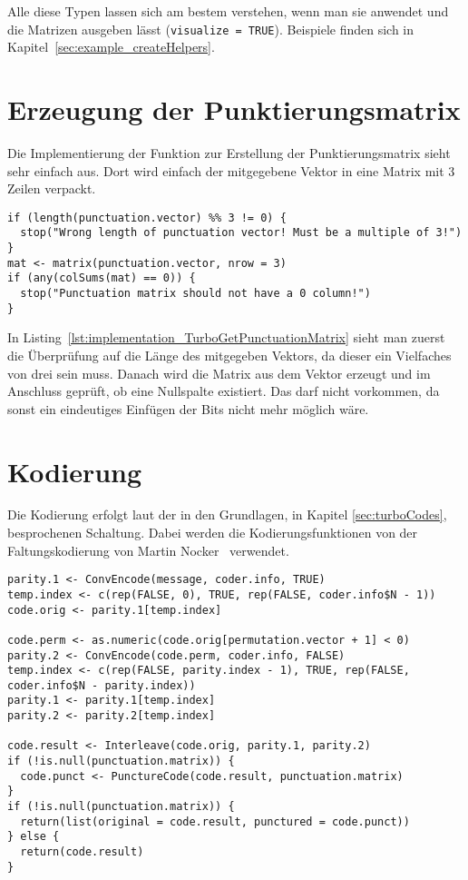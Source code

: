 Alle diese Typen lassen sich am bestem verstehen, wenn man sie anwendet und die Matrizen ausgeben lässt (\texttt{visualize = TRUE}). Beispiele finden sich in Kapitel~\ref{sec:example_createHelpers}.

\FloatBarrier
\section{Erzeugung der Punktierungsmatrix}
\label{sec:implementation_puncturing}
Die Implementierung der Funktion zur Erstellung der Punktierungsmatrix sieht sehr einfach aus. Dort wird einfach der mitgegebene Vektor in eine Matrix mit 3 Zeilen verpackt. 

\begin{lstlisting}[caption=Implementierung von \texttt{TurboGetPunctuationMatrix}, label={lst:implementation_TurboGetPunctuationMatrix}, float=!th]
if (length(punctuation.vector) %% 3 != 0) {
  stop("Wrong length of punctuation vector! Must be a multiple of 3!")
}
mat <- matrix(punctuation.vector, nrow = 3)
if (any(colSums(mat) == 0)) {
  stop("Punctuation matrix should not have a 0 column!")
}
\end{lstlisting}

In Listing~\ref{lst:implementation_TurboGetPunctuationMatrix} sieht man zuerst die Überprüfung auf die Länge des mitgegeben Vektors, da dieser ein Vielfaches von drei sein muss. Danach wird die Matrix aus dem Vektor erzeugt und im Anschluss geprüft, ob eine Nullspalte existiert. Das darf nicht vorkommen, da sonst ein eindeutiges Einfügen der Bits nicht mehr möglich wäre.

\FloatBarrier
\section{Kodierung}
\label{sec:implementation_encode}
Die Kodierung erfolgt laut der in den Grundlagen, in Kapitel \ref{sec:turboCodes}, besprochenen Schaltung. Dabei werden die Kodierungsfunktionen von der Faltungskodierung von Martin Nocker~\cite[S.~26~f.]{nocker} verwendet.

\begin{lstlisting}[caption=Implementierung von \texttt{TurboEncode}, label={lst:implementation_TurboEncode}, float=!th]
parity.1 <- ConvEncode(message, coder.info, TRUE)
temp.index <- c(rep(FALSE, 0), TRUE, rep(FALSE, coder.info$N - 1))
code.orig <- parity.1[temp.index]

code.perm <- as.numeric(code.orig[permutation.vector + 1] < 0)
parity.2 <- ConvEncode(code.perm, coder.info, FALSE)
temp.index <- c(rep(FALSE, parity.index - 1), TRUE, rep(FALSE, coder.info$N - parity.index))
parity.1 <- parity.1[temp.index]
parity.2 <- parity.2[temp.index]

code.result <- Interleave(code.orig, parity.1, parity.2)
if (!is.null(punctuation.matrix)) {
  code.punct <- PunctureCode(code.result, punctuation.matrix)
}
if (!is.null(punctuation.matrix)) {
  return(list(original = code.result, punctured = code.punct))
} else {
  return(code.result)
}
\end{lstlisting}


